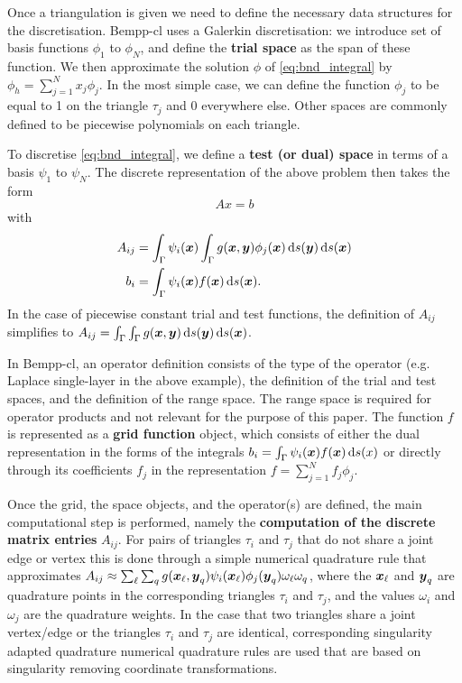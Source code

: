 Once a triangulation is given we need to define the necessary data structures for the discretisation. Bempp-cl uses a Galerkin discretisation: we introduce set of basis functions \(\phi_1\) to \(\phi_N\), and define the \textbf{trial space} as the span of these function. We then approximate the solution \(\phi\) of \cref{eq:bnd_integral} by $\phi_h=\sum_{j=1}^N x_j\phi_j$. In the most simple case, we can define the function \(\phi_j\) to be equal to 1 on the triangle $\tau_j$ and 0 everywhere else. Other spaces are commonly defined to be piecewise polynomials on each triangle.

To discretise \cref{eq:bnd_integral}, we define a \textbf{test (or dual) space} in terms of a basis \(\psi_1\) to \(\psi_N\). The discrete representation of the above problem then takes the form
$$
Ax = b
$$
with
\begin{align*}
A_{ij} &= \int_{\Gamma}\psi_i(\boldsymbol{x})\int_{\Gamma}g(\boldsymbol{x}, \boldsymbol{y})\phi_j(\boldsymbol{x})\,\mathrm{d}s(\boldsymbol{y})\,\mathrm{d}s(\boldsymbol{x})\\
b_i &= \int_{\Gamma}\psi_i(\boldsymbol{x})f(\boldsymbol{x})\,\mathrm{d}s(\boldsymbol{x}).
\end{align*}
In the case of piecewise constant trial and test functions, the definition of $A_{ij}$ simplifies to $A_{ij} = \int_{\Gamma}\int_{\Gamma}g(\boldsymbol{x}, \boldsymbol{y})\,\mathrm{d}s(\boldsymbol{y})\,\mathrm{d}s(\boldsymbol{x})$.

In Bempp-cl, an operator definition consists of the type of the operator (e.g. Laplace single-layer in the above example),
the definition of the trial and test spaces, and the definition of the range space. The range space is required for operator
products and not relevant for the purpose of this paper. The function $f$ is represented as a \textbf{grid function} object, which
consists of either the dual representation in the forms of the integrals $b_i = \int_{\Gamma}\psi_i(\boldsymbol{x})f(\boldsymbol{x})\,\mathrm{d}s(x)$ or directly through its coefficients $f_j$ in the representation $f=\sum_{j=1}^N f_j\phi_j$.

Once the grid, the space objects, and the operator(s) are defined, the main computational step is performed, namely the \textbf{computation of the discrete matrix entries} $A_{ij}$. For pairs of triangles $\tau_i$ and $\tau_j$ that do not share a joint edge or vertex this is done through a simple numerical quadrature rule that approximates $A_{ij}\approx \sum_{\ell}\sum_{q} g(\boldsymbol{x}_\ell, \boldsymbol{y}_q)\psi_i(\boldsymbol{x}_\ell)\phi_j(\boldsymbol{y}_q)\omega_\ell\omega_q$, where the $\boldsymbol{x}_\ell$ and $\boldsymbol{y}_q$ are quadrature points in the corresponding triangles $\tau_i$ and $\tau_j$, and the values $\omega_i$ and $\omega_j$ are the quadrature weights. In the case that two triangles share a joint vertex/edge or the triangles $\tau_i$ and $\tau_j$ are identical, corresponding singularity adapted quadrature numerical quadrature rules are used that are based on singularity removing coordinate transformations.

